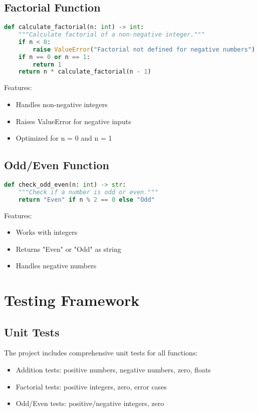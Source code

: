 \documentclass{article}
\begin{document}
\subsection{Factorial Function}
\begin{lstlisting}[language=Python]
def calculate_factorial(n: int) -> int:
    """Calculate factorial of a non-negative integer."""
    if n < 0:
        raise ValueError("Factorial not defined for negative numbers")
    if n == 0 or n == 1:
        return 1
    return n * calculate_factorial(n - 1)
\end{lstlisting}
Features:
\begin{itemize}
    \item Handles non-negative integers
    \item Raises ValueError for negative inputs
    \item Optimized for n = 0 and n = 1
\end{itemize}

\subsection{Odd/Even Function}
\begin{lstlisting}[language=Python]
def check_odd_even(n: int) -> str:
    """Check if a number is odd or even."""
    return "Even" if n % 2 == 0 else "Odd"
\end{lstlisting}
Features:
\begin{itemize}
    \item Works with integers
    \item Returns "Even" or "Odd" as string
    \item Handles negative numbers
\end{itemize}

\section{Testing Framework}
\subsection{Unit Tests}
The project includes comprehensive unit tests for all functions:
\begin{itemize}
    \item Addition tests: positive numbers, negative numbers, zero, floats
    \item Factorial tests: positive integers, zero, error cases
    \item Odd/Even tests: positive/negative integers, zero
\end{itemize}
\end{document}
